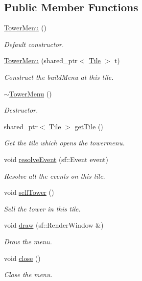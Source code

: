 \subsection*{Public Member Functions}
\begin{DoxyCompactItemize}
\item 
\hyperlink{class_tower_menu_aebdd08286832e919f6f379c79064615e}{Tower\+Menu} ()
\begin{DoxyCompactList}\small\item\em Default constructor. \end{DoxyCompactList}\item 
\hyperlink{class_tower_menu_afb563f251023dc6ad4b7ef17f4d3b46f}{Tower\+Menu} (shared\+\_\+ptr$<$ \hyperlink{class_tile}{Tile} $>$ t)
\begin{DoxyCompactList}\small\item\em Construct the build\+Menu at this tile. \end{DoxyCompactList}\item 
\hyperlink{class_tower_menu_adb6ddb7949289ce8e8e65323640acf7b}{$\sim$\+Tower\+Menu} ()
\begin{DoxyCompactList}\small\item\em Destructor. \end{DoxyCompactList}\item 
shared\+\_\+ptr$<$ \hyperlink{class_tile}{Tile} $>$ \hyperlink{class_tower_menu_a325d61a9e3cc201812eef18ac7ffad2d}{get\+Tile} ()
\begin{DoxyCompactList}\small\item\em Get the tile which opens the towermenu. \end{DoxyCompactList}\item 
void \hyperlink{class_tower_menu_aacd3732231059c039a663f98fd6ec349}{resolve\+Event} (sf\+::\+Event event)
\begin{DoxyCompactList}\small\item\em Resolve all the events on this tile. \end{DoxyCompactList}\item 
void \hyperlink{class_tower_menu_a32b70e92c85a41365360e8e46704bdf7}{sell\+Tower} ()
\begin{DoxyCompactList}\small\item\em Sell the tower in this tile. \end{DoxyCompactList}\item 
void \hyperlink{class_tower_menu_a0ecd4cdad69ed36c06781035d77569bc}{draw} (sf\+::\+Render\+Window \&)
\begin{DoxyCompactList}\small\item\em Draw the menu. \end{DoxyCompactList}\item 
void \hyperlink{class_tower_menu_afc1c7447eacd85abfa1f36ccdf3cbd7d}{close} ()
\begin{DoxyCompactList}\small\item\em Close the menu. \end{DoxyCompactList}\end{DoxyCompactItemize}
